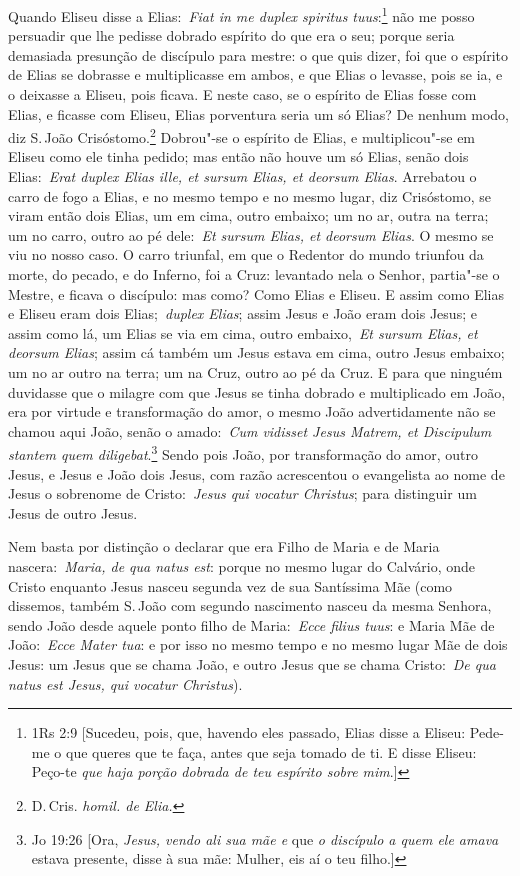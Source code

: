 Quando Eliseu disse a Elias:~\emph{Fiat in me duplex
spiritus tuus}:\footnote{1Rs 2:9 [Sucedeu, pois, que, havendo eles passado, Elias disse a Eliseu: Pede-me o que queres que te faça, antes que seja tomado de ti. E disse Eliseu: Peço-te \textit{que haja porção dobrada de teu espírito sobre mim}.]} não me posso persuadir que lhe pedisse
dobrado espírito do que era o seu; porque seria demasiada presunção de
discípulo para mestre: o que quis dizer, foi que o espírito de Elias se
dobrasse e multiplicasse em ambos, e que Elias o levasse, pois se ia, e
o deixasse a Eliseu, pois ficava. E neste caso, se o espírito de Elias
fosse com Elias, e ficasse com Eliseu, Elias porventura seria um só
Elias? De nenhum modo, diz S.\,João Crisóstomo.\footnote{D.\,Cris. \textit{homil. de Elia.}} Dobrou"-se o espírito de
Elias, e multiplicou"-se em Eliseu como ele tinha pedido; mas então não
houve um só Elias, senão dois Elias:~\emph{Erat duplex Elias ille, et
sursum Elias, et deorsum Elias}. Arrebatou o carro de fogo a Elias, e no
mesmo tempo e no mesmo lugar, diz Crisóstomo, se viram então dois Elias,
um em cima, outro embaixo; um no ar, outra na terra; um no carro, outro
ao pé dele:~\emph{Et sursum Elias, et deorsum Elias}. O mesmo se viu no
nosso caso. O carro triunfal, em que o Redentor do mundo triunfou da
morte, do pecado, e do Inferno, foi a Cruz: levantado nela o Senhor,
partia"-se o Mestre, e ficava o discípulo: mas como? Como Elias e Eliseu.
E assim como Elias e Eliseu eram dois Elias;~\emph{duplex Elias}; assim
Jesus e João eram dois Jesus; e assim como lá, um Elias se via em cima,
outro embaixo,~\emph{Et sursum Elias, et deorsum Elias}; assim cá também
um Jesus estava em cima, outro Jesus embaixo; um no ar outro na terra;
um na Cruz, outro ao pé da Cruz. E para que ninguém duvidasse que o
milagre com que Jesus se tinha dobrado e multiplicado em João, era por
virtude e transformação do amor, o mesmo João advertidamente não se
chamou aqui João, senão o amado:~\emph{Cum vidisset Jesus Matrem, et
Discipulum stantem quem diligebat}.\footnote{Jo 19:26 [Ora, \textit{Jesus, vendo ali sua mãe e} que \textit{o discípulo a quem ele amava} estava presente, disse
à sua mãe: Mulher, eis aí o teu filho.]} Sendo pois João,
por transformação do amor, outro Jesus, e Jesus e João dois Jesus, com
razão acrescentou o evangelista ao nome de Jesus o sobrenome de
Cristo:~\emph{Jesus qui vocatur Christus}; para distinguir um Jesus de
outro Jesus.

Nem basta por distinção o declarar que era Filho de Maria e
de Maria nascera:~\emph{Maria, de qua natus est}: porque no mesmo lugar
do Calvário, onde Cristo enquanto Jesus nasceu segunda vez de sua
Santíssima Mãe (como dissemos, também S.\,João com segundo nascimento
nasceu da mesma Senhora, sendo João desde aquele ponto filho de
Maria:~\emph{Ecce filius tuus}: e Maria Mãe de João:~\emph{Ecce Mater
tua}: e por isso no mesmo tempo e no mesmo lugar Mãe de dois Jesus: um
Jesus que se chama João, e outro Jesus que se chama Cristo:~\emph{De qua
natus est Jesus, qui vocatur Christus}).

